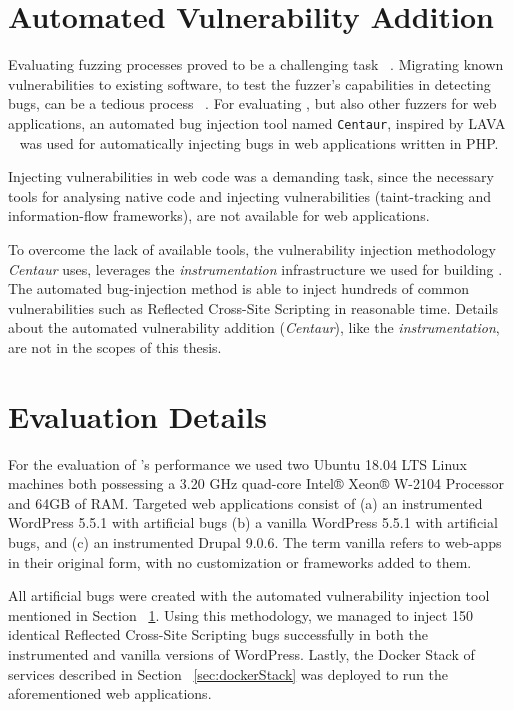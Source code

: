 \section{Automated Vulnerability Addition}\label{sec:automated}
Evaluating fuzzing processes proved to be a challenging task ~\cite{klees2018Evaluation}. Migrating known vulnerabilities to existing software, to test the fuzzer's capabilities in detecting bugs, can be a tedious process ~\cite{bug-reproduction}. For evaluating \pname{}, but also other fuzzers for web applications, an automated bug injection tool named {\tt Centaur}, inspired by LAVA ~\cite{dolan2016lava} was used for automatically injecting bugs in web applications written in PHP. 

Injecting vulnerabilities in web code was a demanding task, since the necessary tools for analysing native code and injecting vulnerabilities (\eg taint-tracking and information-flow frameworks), are not available for web applications. 

To overcome the lack of available tools, the vulnerability injection methodology \textit{Centaur} uses, leverages the \emph{instrumentation} infrastructure we used for building \pname{}. The automated bug-injection method is able to inject hundreds of common vulnerabilities such as Reflected Cross-Site Scripting in reasonable time. Details about the automated vulnerability addition (\textit{Centaur}), like the \emph{instrumentation}, are not in the scopes of this thesis.

\section{Evaluation Details}
For the evaluation of \pname{}'s performance we used two Ubuntu 18.04 LTS Linux machines both possessing a 3.20 GHz quad-core Intel® Xeon® W-2104 Processor and 64GB of RAM. Targeted web applications consist of (a) an instrumented WordPress 5.5.1 with artificial bugs (b) a vanilla  WordPress 5.5.1 with artificial bugs, and (c) an instrumented Drupal 9.0.6. The term vanilla refers to web-apps in their original form, with no customization or frameworks added to them. 

All artificial bugs were created with the automated vulnerability injection tool mentioned in  Section ~\ref{sec:automated}. Using this methodology, we managed to inject 150 identical Reflected Cross-Site Scripting bugs successfully in both the instrumented and vanilla versions of WordPress. Lastly, the Docker Stack of services described in Section ~\ref{sec:dockerStack} was deployed to run the aforementioned web applications.

